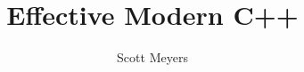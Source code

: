 \documentclass[8pt,a4paper]{book}
\begin{document}
\title{\E Effective Modern C++}
\author{\E Scott Meyers}

\maketitle

\tableofcontents


\end{document}
